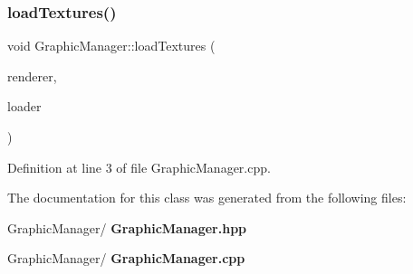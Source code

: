 \subsubsection{load\+Textures()}
{\footnotesize\ttfamily void Graphic\+Manager\+::load\+Textures (\begin{DoxyParamCaption}\item[{S\+D\+L\+\_\+\+Renderer $\ast$}]{renderer,  }\item[{const std\+::shared\+\_\+ptr$<$ \textbf{ Loader} $>$ \&}]{loader }\end{DoxyParamCaption})}



Definition at line 3 of file Graphic\+Manager.\+cpp.



The documentation for this class was generated from the following files\+:\begin{DoxyCompactItemize}
\item 
Graphic\+Manager/\textbf{ Graphic\+Manager.\+hpp}\item 
Graphic\+Manager/\textbf{ Graphic\+Manager.\+cpp}\end{DoxyCompactItemize}
